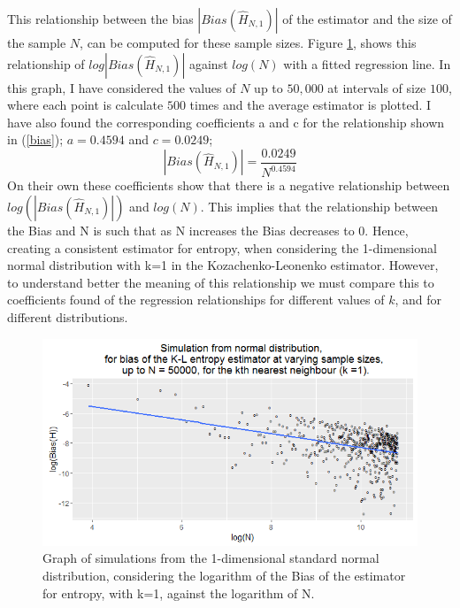 \documentclass{article}
\begin{document}
This relationship between the bias $|Bias(\hat{H}_{N, 1})|$ of the estimator and the size of the sample $N$, can be computed for these sample sizes. Figure \ref{normal_k=1_graph}, shows this relationship of $log|Bias(\hat{H}_{N, 1})|$ against $log(N)$ with a fitted regression line. In this graph, I have considered the values of $N$ up to $50,000$ at intervals of size $100$, where each point is calculate $500$ times and the average estimator is plotted. I have also found the corresponding coefficients a and c for the relationship shown in (\ref{bias}); $a = 0.4594$ and $c = 0.0249$;
\begin{equation}
|Bias(\hat{H}_{N, 1})| = \frac{0.0249}{N^{0.4594}} \nonumber
\end{equation}
On their own these coefficients show that there is a negative relationship between $log(|Bias(\hat{H}_{N, 1})|)$ and $log(N)$. This implies that the relationship between the Bias and N is such that as N increases the Bias decreases to 0. Hence, creating a consistent estimator for entropy, when considering the 1-dimensional normal distribution with k=1 in the Kozachenko-Leonenko estimator. However, to understand better the meaning of this relationship we must compare this to coefficients found of the regression relationships for different values of $k$, and for different distributions.

\begin{figure}
  \begin{center}
    \includegraphics[width=\textwidth]{./Graphs/Normal_k=1_plot.png}
  \end{center}
  \caption{Graph of simulations from the 1-dimensional standard normal distribution, considering the logarithm of the Bias of the estimator for entropy, with k=1, against the logarithm of N.} 
  \label{normal_k=1_graph}
\end{figure}
\end{document}
